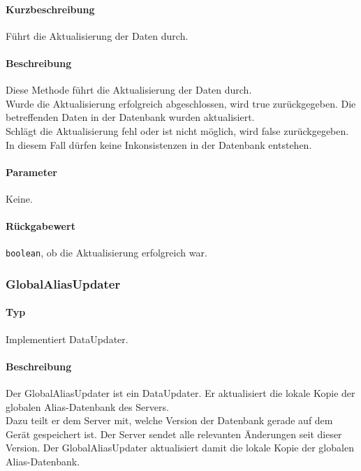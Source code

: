 \paragraph*{Kurzbeschreibung}
Führt die Aktualisierung der Daten durch.
\paragraph*{Beschreibung}
Diese Methode führt die Aktualisierung der Daten durch.\\
Wurde die Aktualisierung erfolgreich abgeschlossen, wird true zurückgegeben. 
Die betreffenden Daten in der Datenbank wurden aktualisiert.\\
Schlägt die Aktualisierung fehl oder ist nicht möglich, wird false zurückgegeben.
In diesem Fall dürfen keine Inkonsistenzen in der Datenbank entstehen.
\paragraph*{Parameter}
Keine.
\paragraph*{Rückgabewert}
\texttt{boolean}, ob die Aktualisierung erfolgreich war.

\subsubsection{GlobalAliasUpdater}
\paragraph*{Typ}
Implementiert DataUpdater.
\paragraph*{Beschreibung}
Der GlobalAliasUpdater ist ein DataUpdater. Er aktualisiert die lokale Kopie der globalen
Alias-Datenbank des Servers. \\
Dazu teilt er dem Server mit, welche Version der Datenbank gerade auf dem Gerät 
gespeichert ist. Der Server sendet alle relevanten Änderungen seit dieser Version. 
Der GlobalAliasUpdater aktualisiert damit die lokale Kopie der globalen Alias-Datenbank.